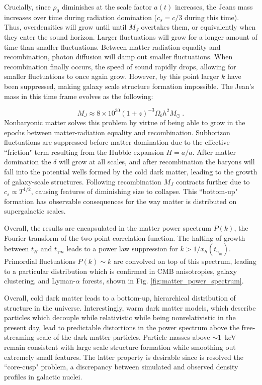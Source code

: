 Crucially, since $\rho_0$ diminishes at the scale factor $a(t)$ increases, the Jeans mass increases over time during radiation domination ($c_s=c/3$ during this time).
Thus, overdensities will grow until until $M_J$ overtakes them, or equivalently when they enter the sound horizon. 
Larger fluctuations will grow for a longer amount of time than smaller fluctuations.
Between matter-radiation equality and recombination, photon diffusion will damp out smaller fluctuations.
When recombination finally occurs, the speed of sound rapidly drops, allowing for smaller fluctuations to once again grow.
However, by this point larger $k$ have been suppressed, making galaxy scale structure formation impossible.
The Jean's mass in this time frame evolves as the following:

\begin{equation}
    M_J  \approx 8 \times 10^{30} (1+z)^{-3} \Omega_b h^2 M_\odot ~.
\end{equation}
\noindent
Nonbaryonic matter solves this problem by virtue of being able to grow in the epochs between matter-radiation equality and recombination.
Subhorizon fluctuations are suppressed before matter domination due to the effective ``friction" term resulting from the Hubble expansion $H = \dot a / a$.
After matter domination the $\delta$ will grow at all scales, and after recombination the baryons will fall into the potential wells formed by the cold dark matter, leading to the growth of galaxy-scale structures.
Following recombination $M_J$ contracts further due to $c_s \propto T^{1/2}$, causing features of diminishing size to collapse.
This ``bottom-up" formation has observable consequences for the way matter is distributed on supergalactic scales.

Overall, the results are encapsulated in the matter power spectrum $P(k)$, the Fourier transform of the two point correlation function.
The halting of growth between $t_H$ and $t_{\gamma m}$ leads to a power law suppression for $k> 1/x_h(t_{\gamma_m})$.
Primordial fluctuations $P(k)\sim k$ are convolved on top of this spectrum, leading to a particular distribution which is confirmed in CMB anisotropies, galaxy clustering, and Lyman-$\alpha$ forests, shown in Fig. \ref{fig:matter_power_spectrum}.

Overall, cold dark matter leads to a bottom-up, hierarchical distribution of structure in the universe.
Interestingly, warm dark matter models, which describe particles which decouple while relativistic while being nonrelativistic in the present day, lead to predictable distortions in the power spectrum above the free-streaming scale of the dark matter particles.
Particle masses above  $\sim 1$~keV remain consistent with large scale structure formation while smoothing out extremely small features.
The latter property is desirable since is resolved the ``core-cusp" problem, a discrepancy between simulated and observed density profiles in galactic nuclei. 


